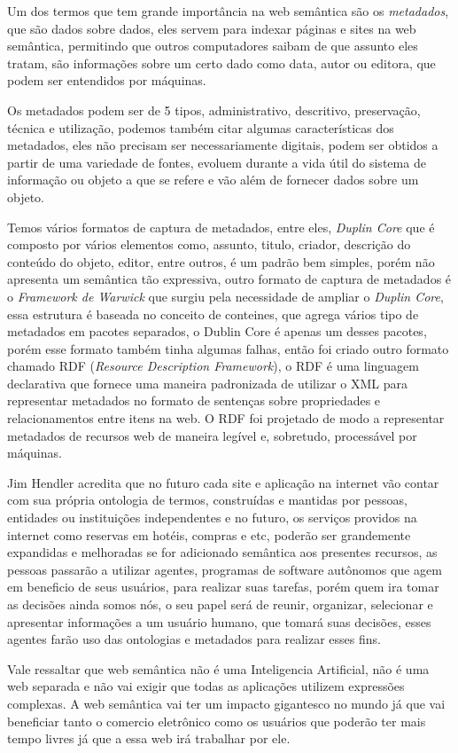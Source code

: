 Um dos termos que tem grande importância na web semântica são os \textit{metadados}, que são dados sobre dados, eles servem para indexar páginas e sites na web semântica, permitindo que outros computadores saibam de que assunto eles tratam, são informações sobre um certo dado como data, autor ou editora, que podem ser entendidos por máquinas.

Os metadados podem ser de 5 tipos, administrativo, descritivo, preservação, técnica e utilização, podemos também citar algumas características dos metadados, eles não precisam ser necessariamente digitais, podem ser obtidos a partir de uma variedade de fontes, evoluem durante a vida útil do sistema de informação ou objeto a que se refere e vão além de fornecer dados sobre um objeto.

Temos vários formatos de captura de metadados, entre eles, \textit{Duplin Core} que é composto por vários elementos como, assunto, titulo, criador, descrição do conteúdo do objeto, editor, entre outros, é um padrão bem simples, porém não apresenta um semântica tão expressiva, outro formato de captura de metadados é o \textit{Framework de Warwick} que surgiu pela necessidade de ampliar o \textit{Duplin Core}, essa estrutura é baseada no conceito de conteines, que agrega vários tipo de metadados em pacotes separados, o Dublin Core é apenas um desses pacotes, porém esse formato também tinha algumas falhas, então foi criado outro formato chamado RDF (\textit{Resource Description Framework}), o RDF é uma linguagem declarativa que fornece uma maneira padronizada de utilizar o XML para representar metadados no formato de sentenças sobre propriedades e relacionamentos entre itens na web. O RDF foi projetado de modo a representar metadados de recursos web de maneira legível e, sobretudo, processável por máquinas.

Jim Hendler acredita que no futuro cada site e aplicação na internet vão contar com sua própria ontologia de termos, construídas e mantidas por pessoas, entidades ou instituições independentes e no futuro, os serviços providos na internet como reservas em hotéis, compras e etc, poderão ser grandemente expandidas e melhoradas se for adicionado semântica aos presentes recursos, as pessoas passarão a utilizar agentes, programas de software autônomos que agem em beneficio de seus usuários, para realizar suas tarefas, porém quem ira tomar as decisões ainda somos nós, o seu papel será de reunir, organizar, selecionar e apresentar informações a um usuário humano, que tomará suas decisões, esses agentes farão uso das ontologias e metadados para realizar esses fins.

Vale ressaltar que web semântica não é uma Inteligencia Artificial, não é uma web separada e não vai exigir que todas as aplicações utilizem expressões complexas. A web semântica vai ter um impacto gigantesco no mundo já que vai beneficiar tanto o comercio eletrônico como os usuários que poderão ter mais tempo livres já que a essa web irá trabalhar por ele.
